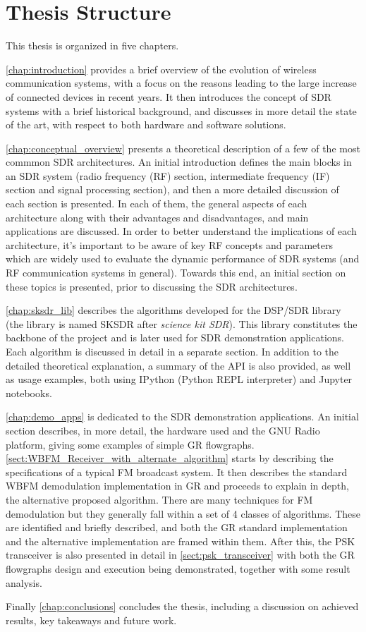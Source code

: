 \section{Thesis Structure}

This thesis is organized in five chapters.

\autoref{chap:introduction} provides a brief overview of the evolution of wireless communication systems, with a focus on the reasons leading to the large increase of connected devices in recent years. It then introduces the concept of SDR systems with a brief historical background, and discusses in more detail the state of the art, with respect to both hardware and software solutions.

\autoref{chap:conceptual_overview} presents a theoretical description of a few of the most commmon SDR architectures. An initial introduction defines the main blocks in an SDR system (radio frequency (RF) section, intermediate frequency (IF) section and signal processing section), and then a more detailed discussion of each section is presented. In each of them, the general aspects of each architecture along with their advantages and disadvantages, and main applications are discussed. In order to better understand the implications of each architecture, it's important to be aware of key RF concepts and parameters which are widely used to evaluate the dynamic performance of SDR systems (and RF communication systems in general). Towards this end, an initial section on these topics is presented, prior to discussing the SDR architectures.

\autoref{chap:sksdr_lib} describes the algorithms developed for the DSP/SDR library (the library is named SKSDR after \emph{science kit SDR}). This library constitutes the backbone of the project and is later used for SDR demonstration applications. Each algorithm is discussed in detail in a separate section. In addition to the detailed theoretical explanation, a summary of the API is also provided, as well as usage examples, both using IPython (Python REPL interpreter) and Jupyter notebooks.

\autoref{chap:demo_apps} is dedicated to the SDR demonstration applications. An initial section describes, in more detail, the hardware used and the GNU Radio platform, giving some examples of simple GR flowgraphs. \autoref{sect:WBFM_Receiver_with_alternate_algorithm} starts by describing the specifications of a typical FM broadcast system. It then describes the standard WBFM demodulation implementation in GR and proceeds to explain in depth, the alternative proposed algorithm. There are many techniques for FM demodulation but they generally fall within a set of 4 classes of algorithms. These are identified and briefly described, and both the GR standard implementation and the alternative implementation are framed within them. After this, the PSK transceiver is also presented in detail in \autoref{sect:psk_transceiver} with both the GR flowgraphs design and execution being demonstrated, together with some result analysis.

Finally \autoref{chap:conclusions} concludes the thesis, including a discussion on achieved results, key takeaways and future work.
